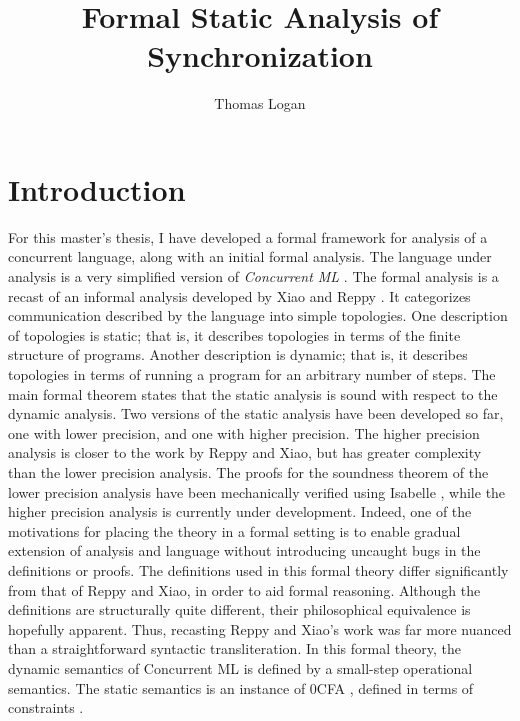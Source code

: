 \documentclass{article}
\title{Formal Static Analysis of Synchronization}
\author{Thomas Logan}
\begin{document}
\maketitle
{}

\newpage
{}


\section{Introduction}
For this master's thesis, I have developed a formal framework for analysis of
a concurrent language, along with an initial formal analysis.  The language under analysis is
a very simplified version of \textit{Concurrent ML} \cite{concurrent_ml}. The formal analysis
is a recast of an informal analysis developed by Xiao and Reppy \cite{specialization}. It
categorizes communication described by the language into simple topologies. One description of
topologies is static; that is, it describes topologies in terms of the finite structure of
programs.  Another description is dynamic; that is, it describes topologies in terms of running
a program for an arbitrary number of steps. The main formal theorem states that the static
analysis is sound with respect to the dynamic analysis. Two versions of the static analysis
have been developed so far, one with lower precision, and one with higher precision. The higher
precision analysis is closer to the work by Reppy and Xiao, but has greater complexity than the
lower precision analysis. The proofs for the soundness theorem of the lower precision analysis
have been mechanically verified using Isabelle \cite{isabelle}, while the higher precision
analysis is currently under development. Indeed, one of the motivations for placing the theory
in a formal setting is to enable gradual extension of analysis and language without introducing
uncaught bugs in the definitions or proofs. The definitions used in this formal theory differ
significantly from that of Reppy and Xiao, in order to aid formal reasoning. Although the
definitions are structurally quite different, their philosophical equivalence is hopefully
apparent. Thus, recasting Reppy and Xiao's work was far more nuanced than a straightforward
syntactic transliteration. In this formal theory, the dynamic semantics of Concurrent ML is
defined by a small-step operational semantics. The static semantics is an instance of 0CFA
\cite{0cfa}, defined in terms of constraints \cite{program_analysis}.
\end{document}
